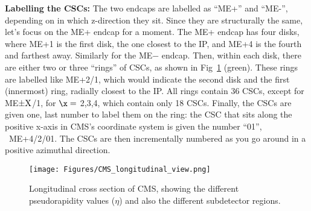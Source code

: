 {\bf Labelling the CSCs:} 
The two endcaps are labelled as ``ME+'' and ``ME-'', depending on in which z-direction they sit. 
Since they are structurally the same, let's focus on the ME+ endcap for a moment. 
The ME+ endcap has four disks, where ME+1 is the first disk, the one closest to the IP, and ME+4 is the fourth and farthest away. 
Similarly for the ME$-$ endcap. 
Then, within each disk, there are either two or three ``rings'' of CSCs, as shown in Fig~\ref{fig:CMS_long_view_subdetectors} (green).
These rings are labelled like ME+2/1, which would indicate the second disk and the first (innermost) ring, radially closest to the IP.
All rings contain 36 CSCs, except for ME${\rm \pm X}$/1, for $\x=$ 2,3,4, which contain only 18 CSCs.
Finally, the CSCs are given one, last number to label them on the ring:
the CSC that sits along the positive x-axis in CMS's coordinate system is given the number ``01'', \eg\ ME+4/2/01. 
The CSCs are then incrementally numbered as you go around in a positive azimuthal direction.
\begin{figure}[pbth]
\centering
\texttt{[image: Figures/CMS\_longitudinal\_view.png]}
    \caption{
    Longitudinal cross section of CMS, showing the different pseudorapidity values ($\eta$) and also the different subdetector regions.
    }
    \label{fig:CMS_long_view_subdetectors}
\end{figure}

